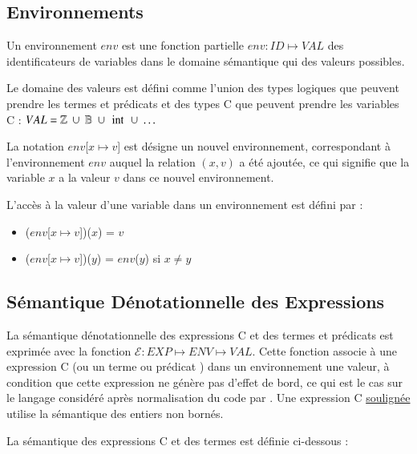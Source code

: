 \subsection{Environnements}

Un environnement $env$ est une fonction partielle $env : ID \mapsto VAL$ des
identificateurs de variables dans le domaine sémantique qui des valeurs
possibles.

Le domaine des valeurs est défini comme l'union des types logiques que peuvent
prendre les termes et prédicats \eacsl et des types C que peuvent prendre les
variables C :
$VAL = \mathbb{Z}~\cup~\mathbb{B}~\cup~\mbox{\lstinline'int'}~\cup~\ldots$

La notation $env$[$x \mapsto v$] est désigne un nouvel environnement,
correspondant à l'environnement $env$ auquel la relation $(x, v)$ a été ajoutée,
ce qui signifie que la variable $x$ a la valeur $v$ dans ce nouvel
environnement.

L'accès à la valeur d'une variable dans un environnement est défini par :
\begin{itemize}
\item ($env$[$x \mapsto v$])($x$) = $v$
\item ($env$[$x \mapsto v$])($y$) = $env$($y$) si $x \neq y$
\end{itemize}


\subsection{Sémantique Dénotationnelle des Expressions}

La sémantique dénotationnelle des expressions C et des termes et prédicats
\eacsl est exprimée avec la fonction
$\mathcal{E} : EXP \mapsto ENV \mapsto VAL$.
Cette fonction associe à une expression C (ou un terme ou prédicat \eacsl) dans
un environnement une valeur, à condition que cette expression ne génère pas
d'effet de bord, ce qui est le cas sur le langage considéré après normalisation
du code par \framac.
Une expression C \underline{soulignée} utilise la sémantique des entiers non
bornés.

La sémantique des expressions C et des termes \eacsl est définie ci-dessous :

